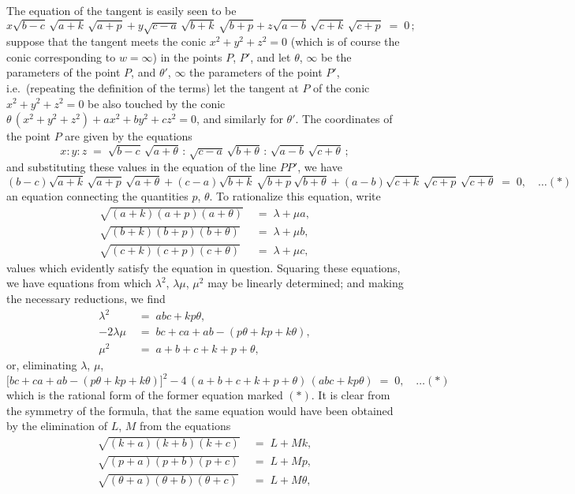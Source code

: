 \documentclass[11pt]{article}
\begin{document}
The equation of the tangent is easily seen to be
\[
x \sqrt{b - c}\,\sqrt{a + k}\,\sqrt{a + p} + y \sqrt{c - a}\,\sqrt{b + k}\,\sqrt{b + p} + z \sqrt{a - b}\,\sqrt{c + k}\,\sqrt{c + p} \;=\; 0\,;
\]
suppose that the tangent meets the conic $x^{2} + y^{2} + z^{2} = 0$ (which is of course the conic corresponding to $w = \infty$) in the points $P$, $P'$, and let $\theta$, $\infty$ be the parameters of the point $P$, and $\theta'$, $\infty$ the parameters of the point $P'$, i.e.\ (repeating the definition of the terms) let the tangent at $P$ of the conic $x^{2} + y^{2} + z^{2} = 0$ be also touched by the conic $\theta\,(x^{2} + y^{2} + z^{2}) + a x^{2} + b y^{2} + c z^{2} = 0$, and similarly for $\theta'$. The coordinates of the point $P$ are given by the equations
\[
x : y : z \;=\; \sqrt{b - c}\,\sqrt{a + \theta} \,:\, \sqrt{c - a}\,\sqrt{b + \theta} \,:\, \sqrt{a - b}\,\sqrt{c + \theta}\,;
\]
and substituting these values in the equation of the line $PP'$, we have
\[
(b - c)\sqrt{a + k}\,\sqrt{a + p}\,\sqrt{a + \theta} + (c - a)\sqrt{b + k}\,\sqrt{b + p}\,\sqrt{b + \theta} + (a - b)\sqrt{c + k}\,\sqrt{c + p}\,\sqrt{c + \theta} \;=\; 0,\quad\ldots(*)
\]
an equation connecting the quantities $p$, $\theta$. To rationalize this equation, write
\begin{align*}
\sqrt{(a + k)(a + p)(a + \theta)} &\;=\; \lambda + \mu a,\\
\sqrt{(b + k)(b + p)(b + \theta)} &\;=\; \lambda + \mu b,\\
\sqrt{(c + k)(c + p)(c + \theta)} &\;=\; \lambda + \mu c,
\end{align*}
values which evidently satisfy the equation in question. Squaring these equations, we have equations from which $\lambda^{2}$, $\lambda\mu$, $\mu^{2}$ may be linearly determined; and making the necessary reductions, we find
\begin{align*}
\lambda^{2} &\;=\; abc + kp\theta,\\
-2\lambda\mu &\;=\; bc + ca + ab - (p\theta + kp + k\theta),\\
\mu^{2} &\;=\; a + b + c + k + p + \theta,
\end{align*}
or, eliminating $\lambda$, $\mu$,
\[
\bigl[bc + ca + ab - (p\theta + kp + k\theta)\bigr]^{2} - 4\,(a + b + c + k + p + \theta)\,(abc + kp\theta) \;=\; 0,\quad\ldots(*)
\]
which is the rational form of the former equation marked $(*)$. It is clear from the symmetry of the formula, that the same equation would have been obtained by the elimination of $L$, $M$ from the equations
\begin{align*}
\sqrt{(k + a)(k + b)(k + c)} &\;=\; L + M k,\\
\sqrt{(p + a)(p + b)(p + c)} &\;=\; L + M p,\\
\sqrt{(\theta + a)(\theta + b)(\theta + c)} &\;=\; L + M \theta,
\end{align*}
\end{document}
